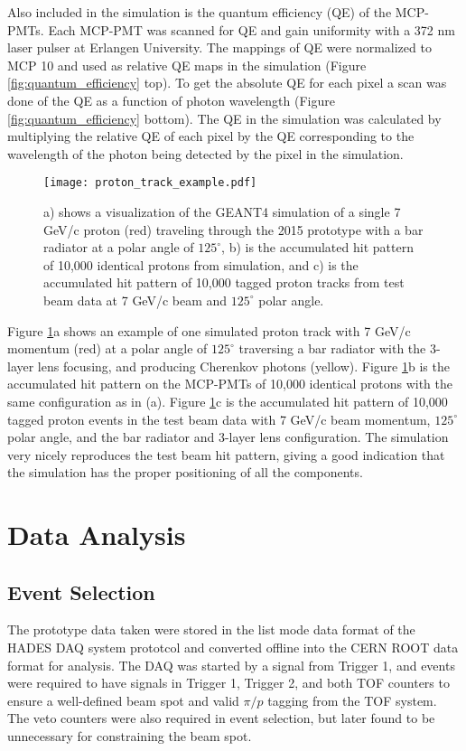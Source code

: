 Also included in the simulation is the quantum efficiency (QE) of the MCP-PMTs. Each MCP-PMT was scanned for QE and gain uniformity with a 372 nm laser pulser at Erlangen University. The mappings of QE were normalized to MCP 10 and used as relative QE maps in the simulation (Figure \ref{fig:quantum_efficiency} top). To get the absolute QE for each pixel a scan was done of the QE as a function of photon wavelength (Figure \ref{fig:quantum_efficiency} bottom). The QE in the simulation was calculated by multiplying the relative QE of each pixel by the QE corresponding to the wavelength of the photon being detected by the pixel in the simulation.

\begin{figure}[!htb]
	\centering
	\texttt{[image: proton\_track\_example.pdf]}
	\caption{a) shows a visualization of the GEANT4 simulation of a single 7 GeV/c proton (red) traveling through the 2015 prototype with a bar radiator at a polar angle of $125^{\circ}$, b) is the accumulated hit pattern of 10,000 identical protons from simulation, and c) is the accumulated hit pattern of 10,000 tagged proton tracks from test beam data at 7 GeV/c beam and $125^{\circ}$ polar angle.}
	\label{fig:proton_track_example}
\end{figure}

Figure \ref{fig:proton_track_example}a shows an example of one simulated proton track with 7 GeV/c momentum (red) at a polar angle of $125^{\circ}$ traversing a bar radiator with the 3-layer lens focusing, and producing Cherenkov photons (yellow). Figure \ref{fig:proton_track_example}b is the accumulated hit pattern on the MCP-PMTs of 10,000 identical protons with the same configuration as in (a). Figure \ref{fig:proton_track_example}c is the accumulated hit pattern of 10,000 tagged proton events in the test beam data with 7 GeV/c beam momentum, $125^{\circ}$ polar angle, and the bar radiator and 3-layer lens configuration. The simulation very nicely reproduces the test beam hit pattern, giving a good indication that the simulation has the proper positioning of all the components.

\section{Data Analysis}
\subsection{Event Selection}
The prototype data taken were stored in the list mode data format of the HADES DAQ system prototcol \cite{HADES_DAQ} and converted offline into the CERN ROOT data format \cite{ROOT} for analysis. The DAQ was started by a signal from Trigger 1, and events were required to have signals in Trigger 1, Trigger 2, and both TOF counters to ensure a well-defined beam spot and valid $\pi/p$ tagging from the TOF system. The veto counters were also required in event selection, but later found to be unnecessary for constraining the beam spot.

